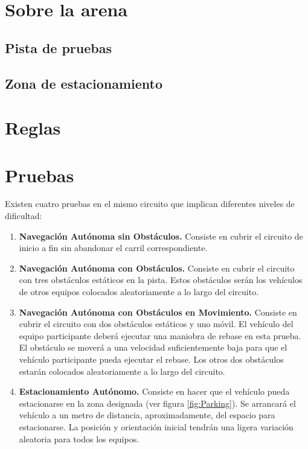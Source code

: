 \documentclass[letterpaper,12pt]{article}
\begin{document}
\section{Sobre la arena}
\subsection{Pista de pruebas}

\subsection{Zona de estacionamiento}


\section{Reglas}


\section{Pruebas}
Existen cuatro pruebas en el mismo circuito que implican diferentes niveles de dificultad:

\begin{enumerate}
\item \textbf{Navegación Autónoma sin Obstáculos.} Consiste en cubrir el circuito de inicio a fin sin abandonar el carril correspondiente.
\item \textbf{Navegación Autónoma con Obstáculos.} Consiste en cubrir el circuito con tres obstáculos estáticos en la pista. Estos obstáculos serán los vehículos de otros equipos colocados aleatoriamente a lo largo del circuito.
\item \textbf{Navegación Autónoma con Obstáculos en Movimiento.} Consiste en cubrir el circuito con dos obstáculos estáticos y uno móvil. El vehículo del equipo participante deberá ejecutar una maniobra de rebase en esta prueba. El obstáculo se moverá a una velocidad suficientemente baja para que el vehículo participante pueda ejecutar el rebase. Los otros dos obstáculos estarán colocados aleatoriamente a lo largo del circuito.
  \item \textbf{Estacionamiento Autónomo.} Consiste en hacer que el vehículo pueda estacionarse en la zona designada (ver figura \ref{fig:Parking}). Se arrancará el vehículo a un metro de distancia, aproximadamente, del espacio para estacionarse. La posición y orientación inicial tendrán una ligera variación aleatoria para todos los equipos. 
\end{enumerate}
\end{document}
